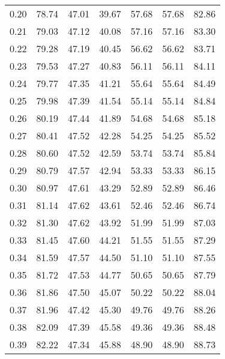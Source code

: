 \begin{tabular}{|c|c|c|c|c|c|c|}
      0.20 &     78.74 &     47.01 &      39.67 &   57.68 &      57.68 &         82.86 \\
      0.21 &     79.03 &     47.12 &      40.08 &   57.16 &      57.16 &         83.30 \\
      0.22 &     79.28 &     47.19 &      40.45 &   56.62 &      56.62 &         83.71 \\
      0.23 &     79.53 &     47.27 &      40.83 &   56.11 &      56.11 &         84.11 \\
      0.24 &     79.77 &     47.35 &      41.21 &   55.64 &      55.64 &         84.49 \\
      0.25 &     79.98 &     47.39 &      41.54 &   55.14 &      55.14 &         84.84 \\
      0.26 &     80.19 &     47.44 &      41.89 &   54.68 &      54.68 &         85.18 \\
      0.27 &     80.41 &     47.52 &      42.28 &   54.25 &      54.25 &         85.52 \\
      0.28 &     80.60 &     47.52 &      42.59 &   53.74 &      53.74 &         85.84 \\
      0.29 &     80.79 &     47.57 &      42.94 &   53.33 &      53.33 &         86.15 \\
      0.30 &     80.97 &     47.61 &      43.29 &   52.89 &      52.89 &         86.46 \\
      0.31 &     81.14 &     47.62 &      43.61 &   52.46 &      52.46 &         86.74 \\
      0.32 &     81.30 &     47.62 &      43.92 &   51.99 &      51.99 &         87.03 \\
      0.33 &     81.45 &     47.60 &      44.21 &   51.55 &      51.55 &         87.29 \\
      0.34 &     81.59 &     47.57 &      44.50 &   51.10 &      51.10 &         87.55 \\
      0.35 &     81.72 &     47.53 &      44.77 &   50.65 &      50.65 &         87.79 \\
      0.36 &     81.86 &     47.50 &      45.07 &   50.22 &      50.22 &         88.04 \\
      0.37 &     81.96 &     47.42 &      45.30 &   49.76 &      49.76 &         88.26 \\
      0.38 &     82.09 &     47.39 &      45.58 &   49.36 &      49.36 &         88.48 \\
      0.39 &     82.22 &     47.34 &      45.88 &   48.90 &      48.90 &         88.73 \\

\end{tabular}
